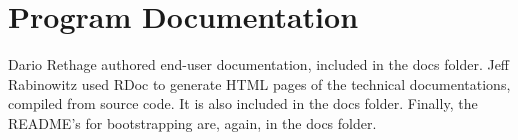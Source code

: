 \chapter{Program Documentation}

Dario Rethage authored end-user documentation, included in the docs folder. Jeff Rabinowitz used RDoc to generate HTML pages of the technical documentations, compiled
from source code. It is also included in the docs folder. Finally, the README's for bootstrapping are, again, in the docs folder.